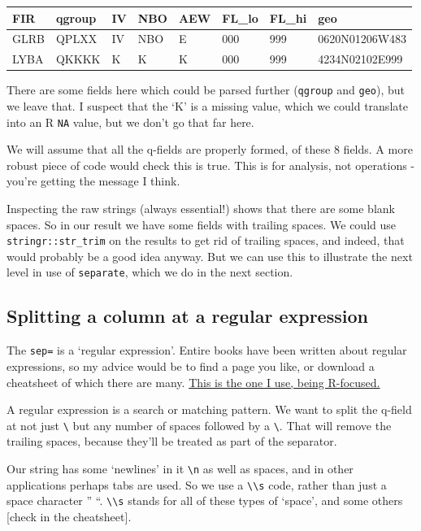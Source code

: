 \documentclass[
]{book}
\begin{document}
\begin{tabular}{l|l|l|l|l|l|l|l}
\hline
FIR & qgroup & IV & NBO & AEW & FL\_lo & FL\_hi & geo\\
\hline
GLRB & QPLXX & IV & NBO & E & 000 & 999 & 0620N01206W483\\
\hline
LYBA & QKKKK & K & K & K & 000 & 999 & 4234N02102E999\\
\hline
\end{tabular}

There are some fields here which could be parsed further (\texttt{qgroup} and \texttt{geo}), but we leave that. I suspect that the `K' is a missing value, which we could translate into an R \texttt{NA} value, but we don't go that far here.

We will assume that all the q-fields are properly formed, of these 8 fields. A more robust piece of code would check this is true. This is for analysis, not operations - you're getting the message I think.

Inspecting the raw strings (always essential!) shows that there are some blank spaces. So in our result we have some fields with trailing spaces. We could use \texttt{stringr::str\_trim} on the results to get rid of trailing spaces, and indeed, that would probably be a good idea anyway. But we can use this to illustrate the next level in use of \texttt{separate}, which we do in the next section.

\hypertarget{splitting-a-column-at-a-regular-expression}{%
\subsection{Splitting a column at a regular expression}\label{splitting-a-column-at-a-regular-expression}}

The \texttt{sep=} is a `regular expression'. Entire books have been written about regular expressions, so my advice would be to find a page you like, or download a cheatsheet of which there are many. \href{https://rstudio.com/wp-content/uploads/2016/09/RegExCheatsheet.pdf}{This is the one I use, being R-focused.}

A regular expression is a search or matching pattern. We want to split the q-field at not just \texttt{\textbackslash{}} but any number of spaces followed by a \texttt{\textbackslash{}}. That will remove the trailing spaces, because they'll be treated as part of the separator.

Our string has some `newlines' in it \texttt{\textbackslash{}n} as well as spaces, and in other applications perhaps tabs are used. So we use a \texttt{\textbackslash{}\textbackslash{}s} code, rather than just a space character '' ``. \texttt{\textbackslash{}\textbackslash{}s} stands for all of these types of `space', and some others {[}check in the cheatsheet{]}.
\end{document}
